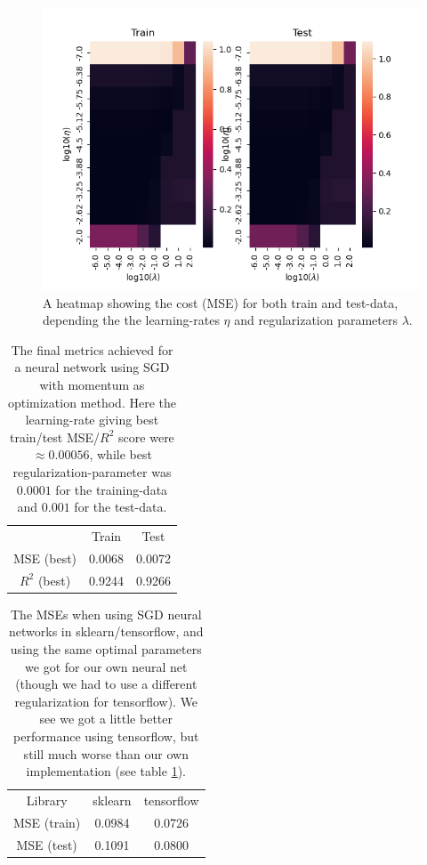 \documentclass{article}
\begin{document}
\begin{figure}
      \centering
      \includegraphics[scale=0.8]{heatmap_frankefunction}
      \caption{A heatmap showing the cost (MSE) for both train and test-data,
            depending the the learning-rates $\eta$ and regularization parameters
            $\lambda$.}
      \label{heatmapplot-franke}
\end{figure}

\begin{table}
      \centering
      \begin{tabular}{| c | c | c |}
                         & Train  & Test   \\
            MSE (best)   & 0.0068 & 0.0072 \\
            $R^2$ (best) & 0.9244 & 0.9266
      \end{tabular}
      \caption{The final metrics achieved for a neural network using SGD with
            momentum as optimization method. Here the learning-rate giving best
            train/test MSE/$R^2$ score were $\approx 0.00056$, while best
            regularization-parameter was $0.0001$ for the training-data and $0.001$
            for the test-data.}
      \label{metrics-nn-franke}
\end{table}

\begin{table}
      \centering
      \begin{tabular}{| c | c | c |}
            Library     & sklearn & tensorflow \\
            MSE (train) & 0.0984  & 0.0726     \\
            MSE (test)  & 0.1091  & 0.0800
      \end{tabular}
      \caption{The MSEs when using SGD neural networks in sklearn/tensorflow,
            and using the same optimal parameters we got for our own neural net
            (though we had to use a different regularization for tensorflow). We see
            we got a little better performance using tensorflow, but still much worse
            than our own implementation (see table \ref{metrics-nn-franke}).}
      \label{metrics-nn-franke-sklearn-tf}
\end{table}
\end{document}
